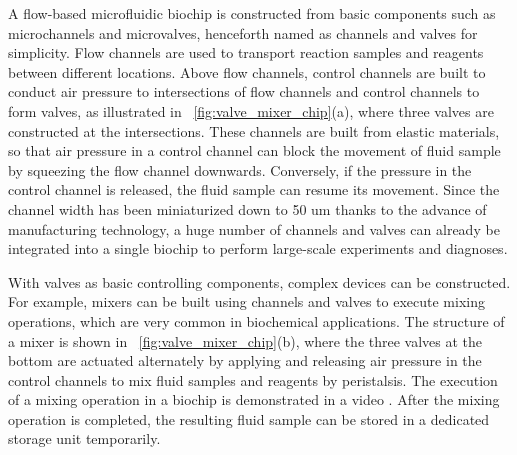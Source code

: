 A flow-based microfluidic biochip is constructed from basic components such as
microchannels and microvalves, henceforth named as channels and valves for
simplicity.
Flow channels are used to transport reaction samples and reagents
between different locations. Above flow channels, control 
channels are built to 
conduct air pressure to intersections of flow channels and control channels 
to form 
valves, as illustrated in \figname~\ref{fig:valve_mixer_chip}(a),
where three valves are constructed at the intersections.
These channels are built from elastic materials, so that
air pressure in a control channel can block the movement of fluid sample
by squeezing the flow channel downwards.
Conversely, if the pressure in the control channel is
released, the fluid sample can resume its movement. 
Since the channel width has been miniaturized
down to 50 um \cite{Studer04} thanks to the advance of manufacturing
technology, a huge number of channels and valves can
already be integrated
into a single biochip to perform large-scale experiments and diagnoses.

With valves as basic controlling components, complex devices 
can be constructed. For example, mixers can be built using
channels and valves to execute mixing operations, which are very
common in biochemical applications. The structure of a mixer is shown
in \figname~\ref{fig:valve_mixer_chip}(b),
where the three valves at the bottom are actuated alternately by 
applying and releasing air pressure in the control
channels 
to mix fluid samples and reagents by peristalsis.
The execution of a mixing operation in a biochip is demonstrated
in a video \cite{mixing_store}. 
After the mixing operation is completed, the resulting fluid sample 
can be stored in a dedicated storage unit temporarily. %


